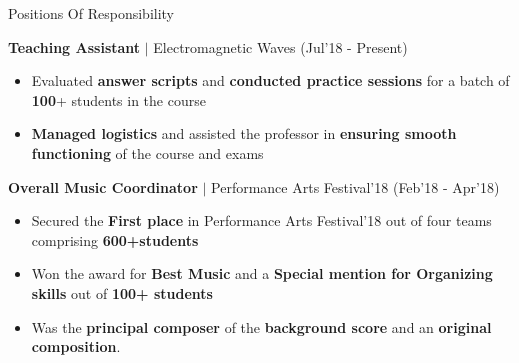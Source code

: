\documentclass{resume}
\newcommand{\sepval}{-0.5em}
\begin{document}

\vspace{-0.2cm}

\begin{rSection}{Positions Of Responsibility}

\vspace{-0.4cm}

	\item {\bf{Teaching Assistant}} $\mid$ Electromagnetic Waves \hfill{(Jul'18 - Present)}
		
		\vspace{-0.2cm}

		\begin{itemize}[leftmargin=*]
			
			\itemsep \sepval
				
			\item Evaluated {\bf answer scripts} and {\bf conducted practice sessions} for a batch of {\bf{100}}+ students in the course

			\item {\bf Managed logistics} and assisted the professor in {\bf ensuring smooth functioning} of the course and exams

	

		\end{itemize}

	\vspace{-0.1cm}

	\item {\bf{Overall Music Coordinator}} $\mid$ Performance Arts Festival'18 \hfill{(Feb'18 - Apr'18)}

		\vspace{-0.2cm}

		\begin{itemize}[leftmargin=*]
			
			\itemsep \sepval
		
			\item Secured the {\bf First place} in Performance Arts Festival'18 out of four teams comprising {\bf 600+students}
 
			\item Won the award for {\bf{Best Music}} and a {\bf Special mention for Organizing skills} out of {\bf 100+ students}	

			\item Was the {\bf{principal composer}} of the {\bf{background score}} and an {\bf{original composition}}. 
	
		\end{itemize}

\end{rSection}
\end{document}
